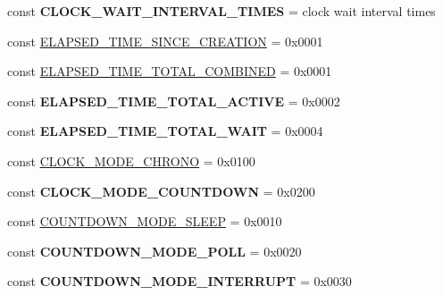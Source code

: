 \begin{DoxyCompactItemize}
\item 
\hypertarget{class_able_polecat___clock_a315fc72b235a24a43763a2f8bd1e0a1a}{}const {\bfseries C\+L\+O\+C\+K\+\_\+\+W\+A\+I\+T\+\_\+\+I\+N\+T\+E\+R\+V\+A\+L\+\_\+\+T\+I\+M\+E\+S} = \textquotesingle{}clock wait interval times\textquotesingle{}\label{class_able_polecat___clock_a315fc72b235a24a43763a2f8bd1e0a1a}

\item 
const \hyperlink{class_able_polecat___clock_a19b46c939051c0d478556151883c9783}{E\+L\+A\+P\+S\+E\+D\+\_\+\+T\+I\+M\+E\+\_\+\+S\+I\+N\+C\+E\+\_\+\+C\+R\+E\+A\+T\+I\+O\+N} = 0x0001
\item 
const \hyperlink{class_able_polecat___clock_a88569a59df69a0777e5206c28facbf63}{E\+L\+A\+P\+S\+E\+D\+\_\+\+T\+I\+M\+E\+\_\+\+T\+O\+T\+A\+L\+\_\+\+C\+O\+M\+B\+I\+N\+E\+D} = 0x0001
\item 
\hypertarget{class_able_polecat___clock_ae1ddc1e08552e4babf26d0fba6a433ec}{}const {\bfseries E\+L\+A\+P\+S\+E\+D\+\_\+\+T\+I\+M\+E\+\_\+\+T\+O\+T\+A\+L\+\_\+\+A\+C\+T\+I\+V\+E} = 0x0002\label{class_able_polecat___clock_ae1ddc1e08552e4babf26d0fba6a433ec}

\item 
\hypertarget{class_able_polecat___clock_ab478cbb4b392f7330eb26aac13cadc54}{}const {\bfseries E\+L\+A\+P\+S\+E\+D\+\_\+\+T\+I\+M\+E\+\_\+\+T\+O\+T\+A\+L\+\_\+\+W\+A\+I\+T} = 0x0004\label{class_able_polecat___clock_ab478cbb4b392f7330eb26aac13cadc54}

\item 
const \hyperlink{class_able_polecat___clock_af2923c94381ca4cb1e50aad421497de9}{C\+L\+O\+C\+K\+\_\+\+M\+O\+D\+E\+\_\+\+C\+H\+R\+O\+N\+O} = 0x0100
\item 
\hypertarget{class_able_polecat___clock_ade4a71fd3ecbf441fec195afa2ed2bd3}{}const {\bfseries C\+L\+O\+C\+K\+\_\+\+M\+O\+D\+E\+\_\+\+C\+O\+U\+N\+T\+D\+O\+W\+N} = 0x0200\label{class_able_polecat___clock_ade4a71fd3ecbf441fec195afa2ed2bd3}

\item 
const \hyperlink{class_able_polecat___clock_a9860c0c8627b07dd82aa030f18413a73}{C\+O\+U\+N\+T\+D\+O\+W\+N\+\_\+\+M\+O\+D\+E\+\_\+\+S\+L\+E\+E\+P} = 0x0010
\item 
\hypertarget{class_able_polecat___clock_ab953a1082ac7e5f5cde1953ebbfb4062}{}const {\bfseries C\+O\+U\+N\+T\+D\+O\+W\+N\+\_\+\+M\+O\+D\+E\+\_\+\+P\+O\+L\+L} = 0x0020\label{class_able_polecat___clock_ab953a1082ac7e5f5cde1953ebbfb4062}

\item 
\hypertarget{class_able_polecat___clock_a19457dc78278c09fb133c9f312527879}{}const {\bfseries C\+O\+U\+N\+T\+D\+O\+W\+N\+\_\+\+M\+O\+D\+E\+\_\+\+I\+N\+T\+E\+R\+R\+U\+P\+T} = 0x0030\label{class_able_polecat___clock_a19457dc78278c09fb133c9f312527879}

\end{DoxyCompactItemize}
